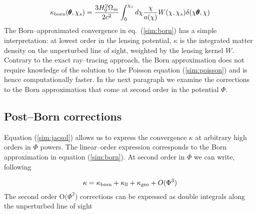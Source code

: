 \documentclass[reprint,aps,prd,superscriptaddress,showkeys,showpacs]{revtex4-1}
\newcommand\pt{\pmb{\theta}}
\begin{document}
\begin{equation}
\label{sim:born}
\kappa_{\rm born}(\pt,\chi_s) = \frac{3H_0^2\Omega_m}{2c^2}\int_0^{\chi_s} d\chi\frac{\chi}{a(\chi)} W(\chi,\chi_s)\delta(\chi\pt,\chi)
\end{equation}
%
The Born--approximated convergence in eq.~(\ref{sim:born}) has a simple interpretation: at lowest order in the lensing potential, $\kappa$ is the integrated matter density on the unperturbed line of sight, weighted by the lensing kernel $W$. Contrary to the exact ray--tracing approach, the Born approximation does not require knowledge of the solution to the Poisson equation (\ref{sim:poisson}) and is hence computationally faster. In the next paragraph we examine the corrections to the Born approximation that come at second order in the potential $\Phi$.  

\subsection{Post--Born corrections}

Equation (\ref{sim:jacsol}) allows us to express the convergence $\kappa$ at arbitrary high orders in $\Phi$ powers. The linear--order expression corresponds to the Born approximation in equation (\ref{sim:born}). At second order in $\Phi$ we can write, following \citep{WLBispectrumDodelson}

\begin{equation}
\label{sim:pb2}
\kappa = \kappa_{\rm born} + \kappa_{\rm ll} + \kappa_{\rm geo} + O(\Phi^3)
\end{equation}
%
The second order O($\Phi^2$) corrections can be expressed as double integrals along the unperturbed line of sight
\end{document}

